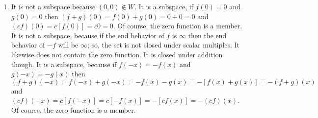 \begin{enumerate}[!HW!, start=1]
\itemspade It is not a subspace because $(0,0)\notin W$. Likewise, it is not closed under addition, e.g. $(1,0), (0,1)\in W$ but $(1,0)+(0,1)=(1,1)\notin W$. It is likewise not closed under scalar multiples, e.g. $(1,0) \in W$ but $2(1,0) = (2,0)\notin W$.
\itemspade It is not a subspace because it is not closed under addition, e.g. $(1,0), (0,1)\in W$ but $(1,0)+(0,1)=(1,1)\notin W$. Of course, there are some instances where the sum is contained, e.g. $(0.1, 0.2) + (-0.1, 0.3) = (0,0.5)\in W$, but closure under addition means that every possible sum is contained not just some sums.  It is likewise not closed under scalar multiples, e.g. $(1,0) \in W$ but $2(1,0) = (2,0)\notin W$. It does contain the zero vector.
\itemspade It is not a subspace because it is not closed under addition. Note that $(1,1), (2,4)\in W$ but $(1,1)+(2,4) = (3,5)\notin W$. It likewise fails closure under scalar multiples since $(1,1)\in W$ but $2(1,1) = (2,2)\notin W$. On the other hand, it does contain the zero vector.
\itemspade It is not a subspace because the sum of two points in $W$ need not belong to $W$, for example, $(1,0)+(0,1) = (1,1)\notin W$. On the other hand, $(0,0)\in W$ and $W$ is closed under scalar multiples. 
\itemspade It is not a subspace because it is not closed under scalar multiples, e.g. $(1,1)\in W$ but $(-1)(1,1) = (-1,-1)\notin W$. Is is closed under addition and contains the zero vector.
\itemspade It is not a subspace because the sum of two such functions will have a $y$-intercept of $2$, not $1$; so, the set is not closed under addition. Also, it is not closed under scalar multiples nor contains the zero function.
\item It is not a subspace because $(0,0)\notin W$. %
\itemspade It is a subspace, if $f(0)=0$ and $g(0)=0$ then $(f+g)(0) = f(0)+g(0) = 0+0=0$ and $(cf)(0) = c[f(0)]=c0=0$. Of course, the zero function is a member.
\itemspade It is not a subspace, because if the end behavior of $f$ is $\infty$ then the end behavior of $-f$ will be $\infty$; so, the set is not closed under scalar multiples. It likewise does not contain the zero function. It is closed under addition though.
\itemspade It is a subspace, because if $f(-x)=-f(x)$ and $g(-x)=-g(x)$ then $(f+g)(-x) = f(-x)+g(-x) = -f(x)-g(x) = -[f(x)+g(x)] = -(f+g)(x)$ and $(cf)(-x) = c[f(-x)] = c[-f(x)] = -[cf(x)] = -(cf)(x)$.  Of course, the zero function is a member.
\end{enumerate}

\vspace{-15 pt}